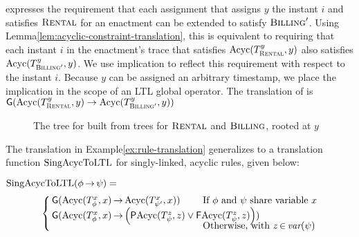 \begin{examp}
  {\TimelyPayment} expresses
  the requirement that each assignment
  that assigns $y$ the instant $i$
  and
  satisfies $\textsc{Rental}$ for an enactment
  can be extended to satisfy $\textsc{Billing}'$.
  Using Lemma\:\ref{lem:acyclic-constraint-translation},
  this is equivalent to requiring
  that each instant $i$ in the enactment's trace
  that satisfies
  $\text{Acyc}(T_{\textsc{Rental}}^{y},y)$
  also satisfies $\text{Acyc}(T_{\textsc{Billing}'}^y,y)$.
  We use implication
  to reflect this requirement with respect to the instant $i$.
  Because 
  $y$ can be assigned an arbitrary timestamp,
  we place the implication in the scope
  of an LTL global operator.
  The translation of {\TimelyPayment} is
  ${\sf G}(
  \text{Acyc}(T_{\textsc{Rental}}^{y},y)
  \rightarrow
  \text{Acyc}(T_{\textsc{Billing}'}^{y},y))$
  \end{examp}

\begin{figure}[t]\centering
  \caption{The tree for {\TimelyPayment} built from trees for ${\textsc{Rental}}$ and ${\textsc{Billing}}$, rooted at $y$}
  \label{fig:timely-payment-rule-tree}
\end{figure}  

The translation in Example\:\ref{ex:rule-translation}
generalizes to a translation function $\text{SingAcycToLTL}$ for singly-linked, acyclic rules,
given below:

$\text{SingAcycToLTL}(\phi\,{\rightarrow}\,\psi)=$
$$\left\{
  \begin{array}{@{\,}l@{~~~~~~~}l@{}}
    {\sf G}(\Acyc(T_\phi^x,x)\tight\rightarrow\Acyc(T_{\psi'}^x,x)) &
      \mbox{If $\phi$ and $\psi$ share variable }x
    \\
    \multicolumn{2}{@{\,}l}{
    {\sf G}(\Acyc(T_\phi^x,x)\tight\rightarrow\!\left(
    {\sf P}\Acyc(T_\psi^z,z)
    \lor{\sf F}\Acyc(T_\psi^z,z)\right))} \\*[-1.5mm]&
      \mbox{Otherwise, with }z\tight\in \var(\psi)
  \end{array}\right.
$$

